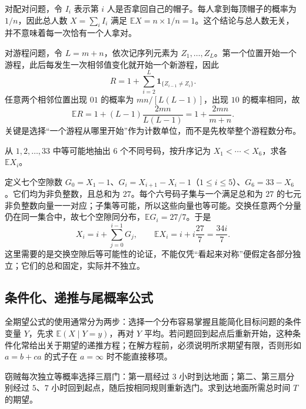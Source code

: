 \begin{solve}
对配对问题，令 $I_i$ 表示第 $i$ 人是否拿回自己的帽子。每人拿到每顶帽子的概率为 $1/n$，因此总人数 $X=\sum_iI_i$ 满足 $\mathbb E X=n\times1/n=1$。这个结论与总人数无关，并不意味着每一次恰有一个人拿对。

对游程问题，令 $L=m+n$，依次记序列元素为 $Z_1,\ldots,Z_L$。第一个位置开始一个游程，此后每发生一次相邻值变化就开始一个新游程，因此
\[
  R=1+\sum_{i=2}^L\mathbf1_{\{Z_{i-1}\ne Z_i\}}.
\]
任意两个相邻位置出现 $01$ 的概率为 $mn/[L(L-1)]$，出现 $10$ 的概率相同，故
\begin{equation}
  \mathbb E R=1+(L-1)\frac{2mn}{L(L-1)}
    =1+\frac{2mn}{m+n}.
  \label{eq:study-expected-runs}
\end{equation}
关键是选择“一个游程从哪里开始”作为计数单位，而不是先枚举整个游程数分布。
\end{solve}

\begin{example}
\label{ex:study-lottery-order-means}
从 $1,2,\ldots,33$ 中等可能地抽出 $6$ 个不同号码，按升序记为 $X_1<\cdots<X_6$，求各 $\mathbb E X_i$。
\end{example}

\begin{solve}
定义七个空隙数 $G_0=X_1-1$、$G_i=X_{i+1}-X_i-1$（$1\le i\le5$）、$G_6=33-X_6$。它们均为非负整数，且总和为 $27$。每个六号码子集与一个满足总和为 $27$ 的七元非负整数向量一一对应；子集等可能，所以这些向量也等可能。交换任意两个分量仍在同一集合中，故七个空隙同分布，$\mathbb E G_i=27/7$。于是
\[
  X_i=i+\sum_{j=0}^{i-1}G_j,
  \qquad \mathbb E X_i=i+i\frac{27}{7}=\frac{34i}{7}.
\]
这里需要的是交换空隙后等可能性的论证，不能仅凭“看起来对称”便假定各部分独立；它们的总和固定，实际并不独立。
\end{solve}

\subsection{条件化、递推与尾概率公式}
\label{subsec:study-conditioning-tail-method}

全期望公式的使用通常分为两步：选择一个分布容易掌握且能简化目标问题的条件变量 $Y$，先求 $\mathbb E(X\mid Y=y)$，再对 $Y$ 平均。若问题回到起点后重新开始，这种条件化常给出关于期望的递推方程；在解方程前，必须说明所求期望有限，否则形如 $a=b+ca$ 的式子在 $a=\infty$ 时不能直接移项。

\begin{example}
\label{ex:study-baghdad-thief}
窃贼每次独立等概率选择三扇门：第一扇经过 $3$ 小时到达地面；第二、第三扇分别经过 $5$、$7$ 小时回到起点，随后按相同规则重新选门。求到达地面所需总时间 $T$ 的期望。
\end{example}

